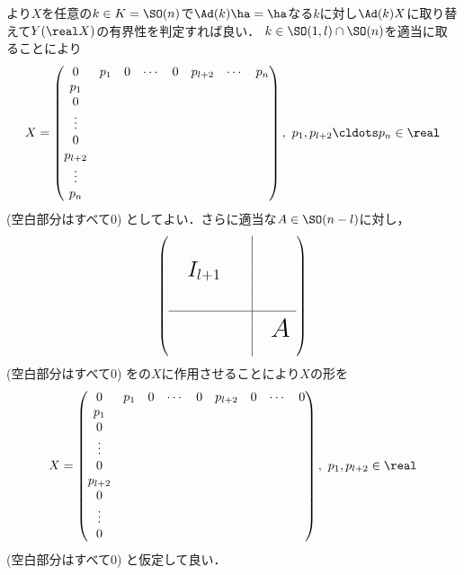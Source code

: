 \begin{npfwn}
  より$X$を任意の$k\in K = \SO(n) $で$\Ad(k)\ha = \ha $なる$k$に対し$\Ad(k) X$に取り替えて$Y(\real X) $の有界性を判定すれば良い．
  $k\in \SO(1,l)\cap\SO(n) $を適当に取ることにより
  \begin{align}
    X =
    \begin{pmatrix}
      0 & p_1 & 0 & \cdots & 0 & p_{l+2} & \cdots & p_{n}\\
      p_1 &  &  &  &  &  &  \\
      0 &  &  &  &  &  &  \\
      \vdots &  &  &  &  &  &  \\
      0&  &  &  &  &  &  \\
      p_{l+2}  &  &  &  &  &  &  \\
      \vdots &  &  &  &  &  &  \\
      p_{n}  &  &  &  &  &  &  \\
    \end{pmatrix},\ p_1,p_{l+2}\cldots p_n \in \real \label{eq:X-1}
  \end{align}
  (空白部分はすべて0) としてよい．さらに適当な$A\in \SO(n-l) $に対し，
  \begin{align*}
     \left(
    \begin{array}{cccc|cc}
      &&&&&\\     
      &&&&&\\
      &\mbox{\smash{\LARGE $I_{l+1}$}}&&&&\\
      &&&&&\\     
      &&&&\\ \hline
      &&&&\\
      &&&&&\mbox{\smash{\huge $A$}}\\
      &&&&&
    \end{array}
               \right)
  \end{align*}
  (空白部分はすべて0) をの$X$に作用させることにより$X$の形を
  \begin{align}
    X =
    \begin{pmatrix}
      0 & p_1 & 0 & \cdots & 0 & p_{l+2} &0  & \cdots & 0\\
      p_1 &  &  &  &  &  &  \\
      0 &  &  &  &  &  &  \\
      \vdots &  &  &  &  &  &  \\
      0&  &  &  &  &  &  \\
      p_{l+2}  &  &  &  &  &  &  \\
      0  &  &  &  &  &  &  \\
      \vdots &  &  &  &  &  &  \\
      0  &  &  &  &  &  &  \\
    \end{pmatrix},\ p_1, p_{l+2}\in \real \label{eq:X-2}
  \end{align}
  (空白部分はすべて0) と仮定して良い．


\end{npfwn}
